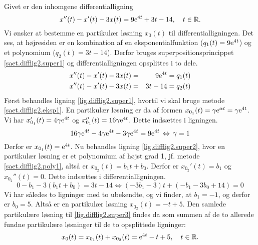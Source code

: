 \begin{example}[Superposition] \label{eks.difflig2.super1}
Givet er den inhomgene differentialligning
\begin{equation}
x''(t) -x'(t) -3 x(t) = 9\mathrm{e}^{4t} + 3t - 14, \quad t \in \mathbb{R}. \label{lig.difflig2.super3}
\end{equation}
Vi ønsker at bestemme en partikulær løsning $ x_0(t) $ til differentialligningen. Det ses, at højresiden er en kombination af en eksponentialfunktion ($q_1(t) = 9\mathrm{e}^{4t} $) og et polynomium ($ q_2(t) = 3t - 14 $). Derfor bruges superpositionsprincippet \ref{saet.difflig2.super1} og differentialligningen opsplittes i to dele.
\eqnl \begin{eqnarray}
x''(t) -x'(t) -3 x(t) &=& 9\mathrm{e}^{4t} = q_1(t) \label{lig.difflig2.super1} \\
x''(t) -x'(t) -3 x(t) &=& 3t - 14 = q_2(t) \label{lig.difflig2.super2}
\end{eqnarray}
Først behandles ligning \eqref{lig.difflig2.super1}, hvortil vi skal bruge metode \ref{saet.difflig2.eksp1}. En partikulær løsning er da af formen $ x_{0_1}(t) = \gamma \mathrm{e}^{\alpha t} = \gamma \mathrm{e}^{4t} $. Vi har $ x_{0_1}'(t) = 4 \gamma \mathrm{e}^{4t} $ og $ x_{0_1}''(t) = 16 \gamma \mathrm{e}^{4t} $. Dette indsættes i ligningen.
\begin{equation}
16 \gamma \mathrm{e}^{4t} -4 \gamma \mathrm{e}^{4t} -3 \gamma \mathrm{e}^{4t} = 9\mathrm{e}^{4t} \, \Leftrightarrow \, \gamma = 1
\end{equation}
Derfor er $ x_{0_1}(t) = \mathrm{e}^{4t} $. \bs
Nu behandles ligning \eqref{lig.difflig2.super2}, hvor en partikulær løsning er et polynomium af højst grad 1, jf. metode \ref{saet.difflig2.poly1}, altså er $ x_{0_2}(t) = b_1t + b_0 $. Derfor er $ x_{0_2}'(t) = b_1 $ og $ x_{0_2}''(t) = 0 $. Dette indsættes i differentialligningen.
\begin{equation}
0 -b_1 -3(b_1t + b_0) = 3t - 14 \Leftrightarrow (-3b_1 - 3) t + (-b_1 - 3b_0 + 14) = 0
\end{equation}
Vi har således to ligninger med to ubekendte, og vi finder, at $ b_1 = -1 $, og derfor er $ b_0 = 5 $. Altså er en partikulær løsning $ x_{0_2}(t) = -t + 5 $. Den samlede partikulære løsning til \eqref{lig.difflig2.super3} findes da som summen af de to allerede fundne partikulære løsninger til de to opsplittede ligninger:
\begin{equation}
x_{0}(t) = x_{0_1}(t) + x_{0_2}(t) = \mathrm{e}^{4t} - t + 5, \quad t \in \mathbb{R}.
\end{equation}
\end{example}

